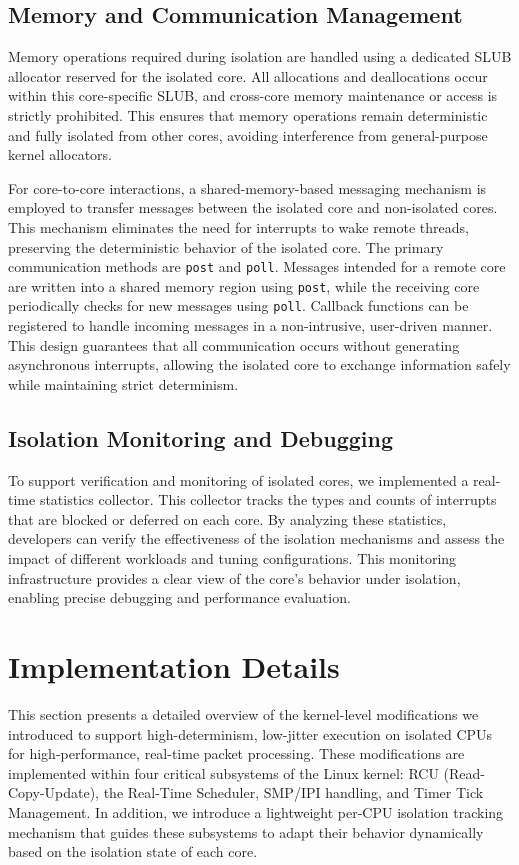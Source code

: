 \documentclass[letterpaper]{article}
\begin{document}
\subsection{Memory and Communication Management}
\label{subsec:memory-communication}

Memory operations required during isolation are handled using a dedicated SLUB allocator reserved for the isolated core. All allocations and deallocations occur within this core-specific SLUB, and cross-core memory maintenance or access is strictly prohibited. This ensures that memory operations remain deterministic and fully isolated from other cores, avoiding interference from general-purpose kernel allocators.

For core-to-core interactions, a shared-memory-based messaging mechanism is employed to transfer messages between the isolated core and non-isolated cores. This mechanism eliminates the need for interrupts to wake remote threads, preserving the deterministic behavior of the isolated core. The primary communication methods are \texttt{post} and \texttt{poll}. Messages intended for a remote core are written into a shared memory region using \texttt{post}, while the receiving core periodically checks for new messages using \texttt{poll}. Callback functions can be registered to handle incoming messages in a non-intrusive, user-driven manner. This design guarantees that all communication occurs without generating asynchronous interrupts, allowing the isolated core to exchange information safely while maintaining strict determinism.

\subsection{Isolation Monitoring and Debugging}
\label{subsec:isolation-monitoring}

To support verification and monitoring of isolated cores, we implemented a real-time statistics collector. This collector tracks the types and counts of interrupts that are blocked or deferred on each core. By analyzing these statistics, developers can verify the effectiveness of the isolation mechanisms and assess the impact of different workloads and tuning configurations. This monitoring infrastructure provides a clear view of the core’s behavior under isolation, enabling precise debugging and performance evaluation.

\section{Implementation Details}
This section presents a detailed overview of the kernel-level modifications we introduced to
support high-determinism, low-jitter execution on isolated CPUs for high-performance, real-time
packet processing. These modifications are implemented within four critical subsystems of the
Linux kernel: RCU (Read-Copy-Update), the Real-Time Scheduler, SMP/IPI handling, and Timer Tick
Management. In addition, we introduce a lightweight per-CPU isolation tracking mechanism that
guides these subsystems to adapt their behavior dynamically based on the isolation state of each
core.
\end{document}
